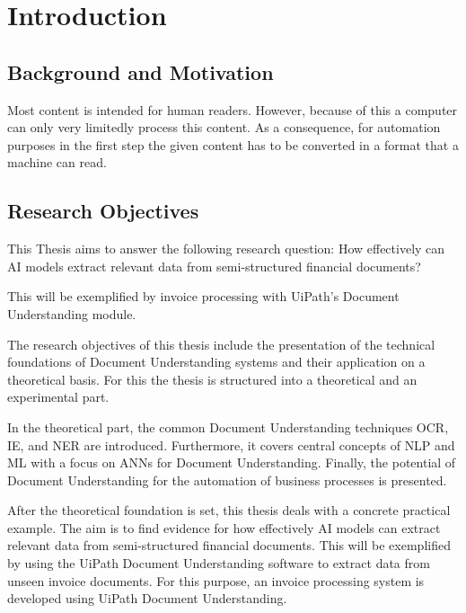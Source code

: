 \chapter{Introduction}

\section{Background and Motivation}

Most content is intended for human readers. However, because of this a computer can only very limitedly process this content. As a consequence, for automation purposes in the first step the given content has to be converted in a format that a machine can read.

\section{Research Objectives}

This Thesis aims to answer the following research question:
How effectively can AI models extract relevant data from semi-structured financial documents?

This will be exemplified by invoice processing with UiPath's Document Understanding module.


The research objectives of this thesis include the presentation of the technical foundations of Document Understanding systems and their application on a theoretical basis. For this the thesis is structured into a theoretical and an experimental part.

In the theoretical part, the common Document Understanding techniques \ac{OCR}, \ac{IE}, and \ac{NER} are introduced. 
Furthermore, it covers central concepts of \ac{NLP} and \ac{ML} with a focus on \acp{ANN} for Document Understanding. 
Finally, the potential of Document Understanding for the automation of business processes is presented.

After the theoretical foundation is set, this thesis deals with a concrete practical example. The aim is to find evidence for how effectively AI models can extract relevant data from semi-structured financial documents. This will be exemplified by using the UiPath Document Understanding software to extract data from unseen invoice documents.
For this purpose, an invoice processing system is developed using UiPath Document Understanding.